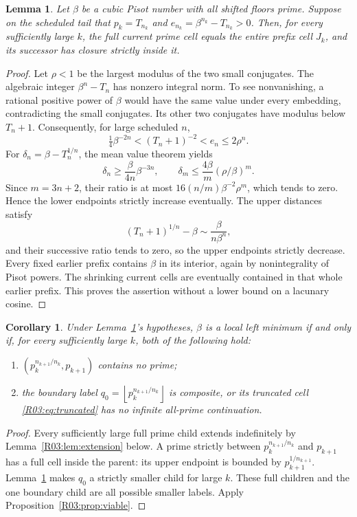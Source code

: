 \documentclass[11pt,a4paper]{article}
\newtheorem{lemma}[theorem]{Lemma}\newtheorem{proposition}[theorem]{Proposition}
\newtheorem{corollary}[theorem]{Corollary}\newtheorem{mainthm}[theorem]{Theorem}
\theoremstyle{definition}\newtheorem{definition}[theorem]{Definition}
\theoremstyle{remark}\newtheorem{remark}[theorem]{Remark}
\newcommand{\floor}[1]{\left\lfloor#1\right\rfloor}
\begin{document}
\begin{lemma}\label{R03:lem:nesting}
Let $\beta$ be a cubic Pisot number with all shifted floors prime.
Suppose on the scheduled tail that $p_k=T_{n_k}$ and
$e_{n_k}=\beta^{n_k}-T_{n_k}>0$. Then, for every sufficiently large
$k$, the full current prime cell equals the entire prefix cell $J_k$,
and its successor has closure strictly inside it.
\end{lemma}
\begin{proof}
Let $\rho<1$ be the largest modulus of the two small conjugates.
The algebraic integer $\beta^n-T_n$ has nonzero integral norm.
To see nonvanishing, a rational positive power of $\beta$ would
have the same value under every embedding, contradicting the small
conjugates. Its other two conjugates have modulus below $T_n+1$.
Consequently, for large scheduled $n$,
\begin{equation}\label{R03:eq:normlower}
 \tfrac14\beta^{-2n}<(T_n+1)^{-2}<e_n\le2\rho^n.
\end{equation}
For $\delta_n=\beta-T_n^{1/n}$, the mean value theorem yields
\[
 \delta_n\ge\frac{\beta}{4n}\beta^{-3n},\qquad
 \delta_m\le\frac{4\beta}{m}(\rho/\beta)^m.
\]
Since $m=3n+2$, their ratio is at most
$16(n/m)\beta^{-2}\rho^m$, which tends to zero. Hence the lower
endpoints strictly increase eventually. The upper distances satisfy
\[
 (T_n+1)^{1/n}-\beta\sim\frac{\beta}{n\beta^n},
\]
and their successive ratio tends to zero, so the upper endpoints
strictly decrease. Every fixed earlier prefix contains $\beta$ in
its interior, again by nonintegrality of Pisot powers. The shrinking
current cells are eventually contained in that whole earlier prefix.
This proves the assertion without a lower bound on a lacunary cosine.
\end{proof}

\begin{corollary}\label{R03:cor:affineiff}
Under Lemma~\ref{R03:lem:nesting}'s hypotheses, $\beta$ is a local left
minimum if and only if, for every sufficiently large $k$, both of
the following hold:
\begin{enumerate}[label=(\roman*)]
\item $(p_k^{n_{k+1}/n_k},p_{k+1})$ contains no prime;
\item the boundary label $q_0=\floor{p_k^{n_{k+1}/n_k}}$ is composite,
or its truncated cell \eqref{R03:eq:truncated} has no infinite
all-prime continuation.
\end{enumerate}
\end{corollary}
\begin{proof}
Every sufficiently large full prime child extends indefinitely by
Lemma~\ref{R03:lem:extension} below. A prime strictly between
$p_k^{n_{k+1}/n_k}$ and $p_{k+1}$ has a full cell inside the parent:
its upper endpoint is bounded by $p_{k+1}^{1/n_{k+1}}$.
Lemma~\ref{R03:lem:nesting} makes $q_0$ a strictly smaller child for
large $k$. These full children and the one boundary child are all
possible smaller labels. Apply Proposition~\ref{R03:prop:viable}.
\end{proof}
\end{document}
